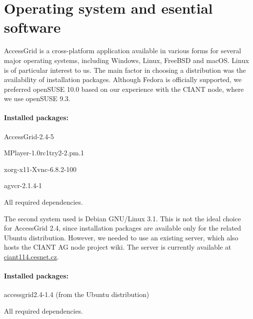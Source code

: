 \section{Operating system and esential software}

AccessGrid is a cross-platform application available in various forms for several major operating systems, including Windows, Linux, FreeBSD and macOS. Linux is of particular interest to us. The main factor in choosing a distribution was the availability of installation packages. Although Fedora is officially supported, we preferred openSUSE 10.0 based on our experience with the CIANT node, where we use openSUSE 9.3.

\paragraph*{Installed packages:}
\begin{paklist}
\item AccessGrid-2.4-5
\item MPlayer-1.0rc1try2-2.pm.1
\item xorg-x11-Xvnc-6.8.2-100
\item agvcr-2.1.4-1
\item All required dependencies.
\end{paklist}

The second system used is Debian GNU/Linux 3.1. This is not the ideal choice for AccessGrid 2.4, since installation packages are available only for the related Ubuntu distribution. However, we needed to use an existing server, which also hosts the CIANT AG node project wiki. The server is currently available at \url{ciant114.cesnet.cz}.

\paragraph*{Installed packages:}
\begin{paklist}
\item accessgrid2.4-1.4 (from the Ubuntu distribution)
\item All required dependencies.
\end{paklist}

